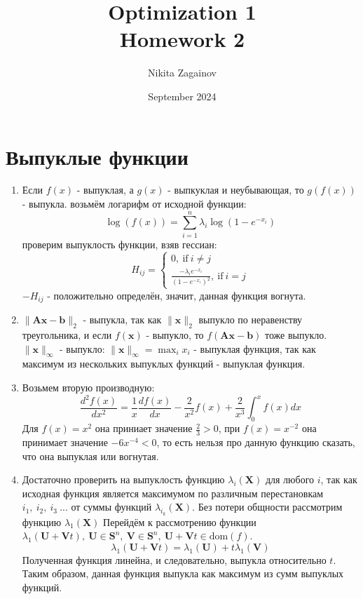 \documentclass{article}
\title{Optimization 1 \\ Homework 2}
\author{Nikita Zagainov}
\date{September 2024}
\begin{document}
\section{Выпуклые функции}
\begin{enumerate}
    \item Если $f(x)$ - выпуклая, а $g(x)$ - выпкуклая и неубывающая, то $g(f(x))$ - выпукла. возьмём логарифм от исходной функции:
          $$
              \log(f(x)) = \sum_{i=1}^{n}{\lambda_i\log(1-e^{-x_i})}
          $$
          проверим выпуклость функции, взяв гессиан:
          $$
              H_{ij} = \begin{cases}
                  0, \ \text{if} \ i \neq j \\
                  \frac{-\lambda_i e^{-x_i}}{(1-e^{-x_i})^2}, \  \text{if} \ i = j
              \end{cases}
          $$
          $-H_{ij}$ - положительно определён, значит, данная функция вогнута.

    \item $\lVert \mathbf{A} \mathbf{x} - \mathbf{b} \rVert_2$ - выпукла, так как $\lVert \mathbf{x} \rVert_2$ выпукло по неравенству треугольника, и если $f(\mathbf{x})$ - выпукло, то $f(\mathbf{A} \mathbf{x} - \mathbf{b})$ тоже выпукло.
          $\lVert \mathbf{x} \rVert_{\infty}$ - выпукло: $\lVert \mathbf{x} \rVert_{\infty} = \max_{i}{x_i}$ - выпуклая функция, так как максимум из нескольких выпуклых функций - выпуклая функция.

    \item Возьмем вторую производную:
          $$
              \frac{d^2f(x)}{dx^2} = \frac{1}{x}\frac{df(x)}{dx} - \frac{2}{x^2}f(x) + \frac{2}{x^3}\int_0^x{f(x)dx}
          $$
          Для $f(x) = x^2$ она приниает значение $\frac{2}{3} > 0$, при $f(x) = x^{-2}$ она принимает значение $-6x^{-4} < 0$, то есть нельзя про данную функцию сказать, что она выпуклая или вогнутая.

    \item Достаточно проверить на выпуклость функцию $\lambda_i(\mathbf{X})$ для любого $i$, так как исходная функция является максимумом по различным перестановкам $i_1, \ i_2, \ i_3 \ ...$ от суммы функций $\lambda_{i_k}(\mathbf{X})$. Без потери общности рассмотрим функцию $\lambda_1(\mathbf{X})$ Перейдём к рассмотрению функции $\lambda_1(\mathbf{U} + \mathbf{V}t), \ \mathbf{U} \in \mathbf{S}^n, \ \mathbf{V} \in \mathbf{S}^n, \ \mathbf{U} + \mathbf{V}t \in \mathrm{dom}(f)$.
          $$
              \lambda_1(\mathbf{U} + \mathbf{V}t) = \lambda_1(\mathbf{U}) + t\lambda_1(\mathbf{V})
          $$
          Полученная функция линейна, и следовательно, выпукла относительно $t$. Таким образом, данная функция выпукла как максимум из сумм выпуклых функций.


\end{enumerate}
\end{document}
